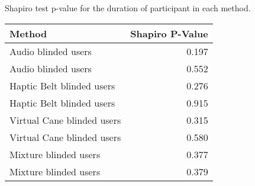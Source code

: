
\centering
\caption{Shapiro test p-value for the duration of participant in each method.}
\label{tab:shapiro_duration}
\begin{tabular}{lr}
\toprule
                    Method &  Shapiro P-Value \\
\midrule
       Audio blinded users &            0.197 \\
       Audio blinded users &            0.552 \\
 Haptic Belt blinded users &            0.276 \\
 Haptic Belt blinded users &            0.915 \\
Virtual Cane blinded users &            0.315 \\
Virtual Cane blinded users &            0.580 \\
     Mixture blinded users &            0.377 \\
     Mixture blinded users &            0.379 \\
\bottomrule
\end{tabular}
